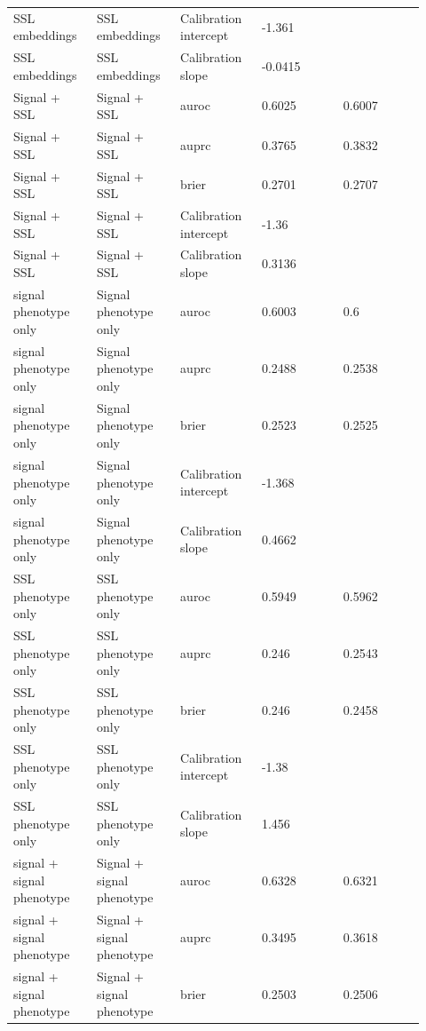 \documentclass[utf8]{frontiers_suppmat}
\begin{document}
\begin{landscape}
\begin{longtable}{L{0.184\linewidth} L{0.184\linewidth} L{0.184\linewidth} L{0.184\linewidth} L{0.184\linewidth}}
SSL embeddings & SSL embeddings & Calibration intercept & -\allowbreak{}1.\allowbreak{}361 &  \\
SSL embeddings & SSL embeddings & Calibration slope & -\allowbreak{}0.\allowbreak{}0415 &  \\
Signal + SSL & Signal + SSL & auroc & 0.\allowbreak{}6025 & 0.\allowbreak{}6007 \\
Signal + SSL & Signal + SSL & auprc & 0.\allowbreak{}3765 & 0.\allowbreak{}3832 \\
Signal + SSL & Signal + SSL & brier & 0.\allowbreak{}2701 & 0.\allowbreak{}2707 \\
Signal + SSL & Signal + SSL & Calibration intercept & -\allowbreak{}1.\allowbreak{}36 &  \\
Signal + SSL & Signal + SSL & Calibration slope & 0.\allowbreak{}3136 &  \\
signal phenotype only & Signal phenotype only & auroc & 0.\allowbreak{}6003 & 0.\allowbreak{}6 \\
signal phenotype only & Signal phenotype only & auprc & 0.\allowbreak{}2488 & 0.\allowbreak{}2538 \\
signal phenotype only & Signal phenotype only & brier & 0.\allowbreak{}2523 & 0.\allowbreak{}2525 \\
signal phenotype only & Signal phenotype only & Calibration intercept & -\allowbreak{}1.\allowbreak{}368 &  \\
signal phenotype only & Signal phenotype only & Calibration slope & 0.\allowbreak{}4662 &  \\
SSL phenotype only & SSL phenotype only & auroc & 0.\allowbreak{}5949 & 0.\allowbreak{}5962 \\
SSL phenotype only & SSL phenotype only & auprc & 0.\allowbreak{}246 & 0.\allowbreak{}2543 \\
SSL phenotype only & SSL phenotype only & brier & 0.\allowbreak{}246 & 0.\allowbreak{}2458 \\
SSL phenotype only & SSL phenotype only & Calibration intercept & -\allowbreak{}1.\allowbreak{}38 &  \\
SSL phenotype only & SSL phenotype only & Calibration slope & 1.\allowbreak{}456 &  \\
signal + signal phenotype & Signal + signal phenotype & auroc & 0.\allowbreak{}6328 & 0.\allowbreak{}6321 \\
signal + signal phenotype & Signal + signal phenotype & auprc & 0.\allowbreak{}3495 & 0.\allowbreak{}3618 \\
signal + signal phenotype & Signal + signal phenotype & brier & 0.\allowbreak{}2503 & 0.\allowbreak{}2506 \\

\end{longtable}
\end{landscape}
\end{document}
